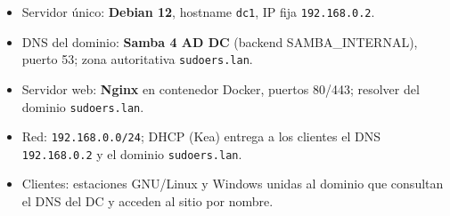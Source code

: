 \begin{itemize}
  \item Servidor \'unico: \textbf{Debian 12}, hostname \texttt{dc1}, IP fija
        \texttt{192.168.0.2}.
  \item DNS del dominio: \textbf{Samba 4 AD DC} (backend SAMBA\_INTERNAL),
        puerto 53; zona autoritativa \texttt{sudoers.lan}.
  \item Servidor web: \textbf{Nginx} en contenedor Docker, puertos 80/443;
        resolver del dominio \texttt{sudoers.lan}.
  \item Red: \texttt{192.168.0.0/24}; DHCP (Kea) entrega a los clientes el
        DNS \texttt{192.168.0.2} y el dominio \texttt{sudoers.lan}.
  \item Clientes: estaciones GNU/Linux y Windows unidas al dominio que
        consultan el DNS del DC y acceden al sitio por nombre.
\end{itemize}